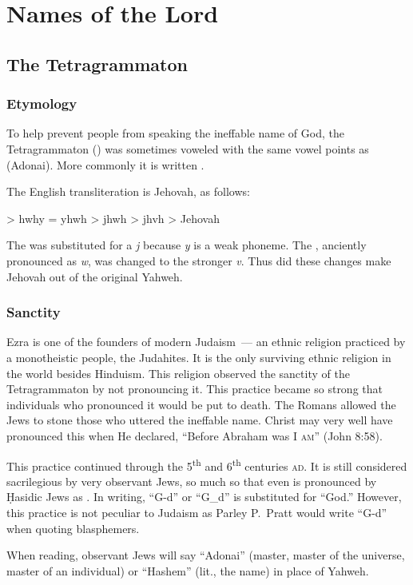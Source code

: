\chapter{Names of the Lord}\label{app:names-of-the-lord}
\section{The Tetragrammaton}
\subsection{Etymology}
To help prevent people from speaking the ineffable name of God, the Tetragrammaton () was sometimes voweled with the same vowel points as  (Adonai). More commonly it is written .

The English transliteration is Jehovah, as follows:
\begin{center}
     > hwhy = yhwh > jhwh > jhvh > Jehovah
\end{center}
The  was substituted for a \emph{j} because \emph{y} is a weak phoneme. The , anciently pronounced as \emph{w}, was changed to the stronger \emph{v}. Thus did these changes make Jehovah out of the original Yahweh.

\subsection{Sanctity}
Ezra is one of the founders of modern Judaism~--- an ethnic religion practiced by a monotheistic people, the Judahites. It is the only surviving ethnic religion in the world besides Hinduism. This religion observed the sanctity of the Tetragrammaton by not pronouncing it. This practice became so strong that individuals who pronounced it would be put to death. The Romans allowed the Jews to stone those who uttered the ineffable name. Christ may very well have pronounced this when He declared, ``Before Abraham was \textsc{I am}'' (John 8:58).

This practice continued through the 5\textsuperscript{th} and 6\textsuperscript{th} centuries \textsc{ad}. It is still considered sacrilegious by very observant Jews, so much so that even  is pronounced by \d{H}asidic Jews as . In writing, ``G-d'' or ``G\_{}d'' is substituted for ``God.'' However, this practice is not peculiar to Judaism as Parley P.\ Pratt would write ``G-d'' when quoting blasphemers.

When reading, observant Jews will say ``Adonai'' (master, master of the universe, master of an individual) or ``Hashem'' (lit., the name) in place of Yahweh.

